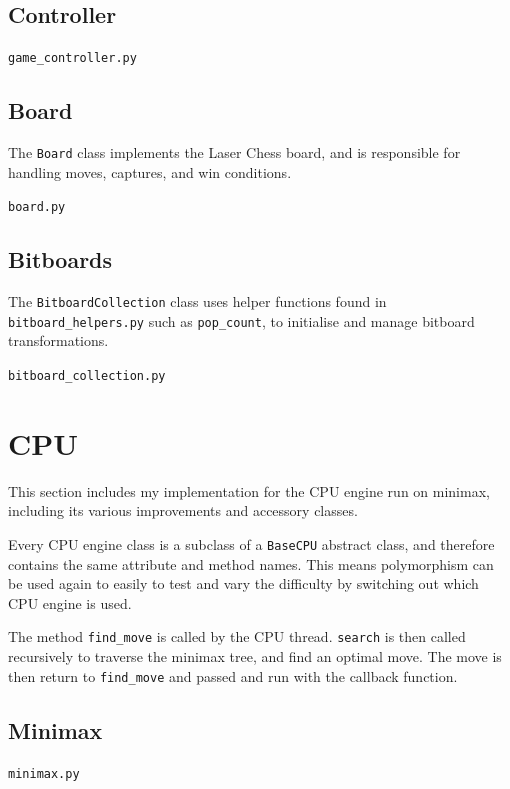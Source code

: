 \documentclass[../main/main.tex]{subfiles}
\begin{document}
\subsection{Controller}
\noindent\verb|game_controller.py|


\subsection{Board}
The \lstinline{Board} class implements the Laser Chess board, and is responsible for handling moves, captures, and win conditions.

\noindent\verb|board.py|


\subsection{Bitboards}
\label{sec:bitboards}
The \lstinline{BitboardCollection} class uses helper functions found in \lstinline{bitboard_helpers.py} such as \lstinline{pop_count}, to initialise and manage bitboard transformations.

\noindent\verb|bitboard_collection.py|


\section{CPU}
This section includes my implementation for the CPU engine run on minimax, including its various improvements and accessory classes.

Every CPU engine class is a subclass of a \lstinline{BaseCPU} abstract class, and therefore contains the same attribute and method names. This means polymorphism can be used again to easily to test and vary the difficulty by switching out which CPU engine is used.

The method \lstinline{find_move} is called by the CPU thread. \lstinline{search} is then called recursively to traverse the minimax tree, and find an optimal move. The move is then return to \lstinline{find_move} and passed and run with the callback function.

\subsection{Minimax}
\label{sec:minimax}
\noindent\verb|minimax.py|

\end{document}
